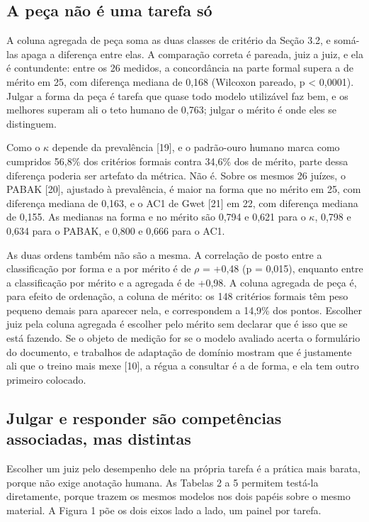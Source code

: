 \documentclass{IOS-Book-Article}
\begin{document}
\subsection{A peça não é uma tarefa só}

A coluna agregada de peça soma as duas classes de critério da Seção 3.2, e somá-las apaga a diferença entre elas. A comparação correta é pareada, juiz a juiz, e ela é contundente: entre os 26 medidos, a concordância na parte formal supera a de mérito em 25, com diferença mediana de 0,168 (Wilcoxon pareado, p < 0,0001). Julgar a forma da peça é tarefa que quase todo modelo utilizável faz bem, e os melhores superam ali o teto humano de 0,763; julgar o mérito é onde eles se distinguem.

Como o $\kappa$ depende da prevalência [19], e o padrão-ouro humano marca como cumpridos 56,8\% dos critérios formais contra 34,6\% dos de mérito, parte dessa diferença poderia ser artefato da métrica. Não é. Sobre os mesmos 26 juízes, o PABAK [20], ajustado à prevalência, é maior na forma que no mérito em 25, com diferença mediana de 0,163, e o AC1 de Gwet [21] em 22, com diferença mediana de 0,155. As medianas na forma e no mérito são 0,794 e 0,621 para o $\kappa$, 0,798 e 0,634 para o PABAK, e 0,800 e 0,666 para o AC1.

As duas ordens também não são a mesma. A correlação de posto entre a classificação por forma e a por mérito é de $\rho$ = +0,48 (p = 0,015), enquanto entre a classificação por mérito e a agregada é de +0,98. A coluna agregada de peça é, para efeito de ordenação, a coluna de mérito: os 148 critérios formais têm peso pequeno demais para aparecer nela, e correspondem a 14,9\% dos pontos. Escolher juiz pela coluna agregada é escolher pelo mérito sem declarar que é isso que se está fazendo. Se o objeto de medição for se o modelo avaliado acerta o formulário do documento, e trabalhos de adaptação de domínio mostram que é justamente ali que o treino mais mexe [10], a régua a consultar é a de forma, e ela tem outro primeiro colocado.

\subsection{Julgar e responder são competências associadas, mas distintas}

Escolher um juiz pelo desempenho dele na própria tarefa é a prática mais barata, porque não exige anotação humana. As Tabelas 2 a 5 permitem testá-la diretamente, porque trazem os mesmos modelos nos dois papéis sobre o mesmo material. A Figura 1 põe os dois eixos lado a lado, um painel por tarefa.
\end{document}
